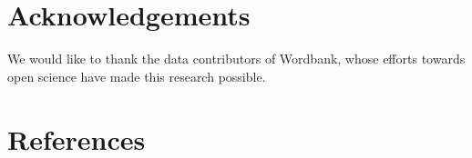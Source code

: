 \documentclass[10pt, letterpaper]{article}
\begin{document}
\pagebreak

\section{Acknowledgements}\label{acknowledgements}

We would like to thank the data contributors of Wordbank, whose efforts
towards open science have made this research possible.

\section{References}\label{references}

\setlength{\parindent}{-0.1in} 
\setlength{\leftskip}{0.125in}

\noindent
\end{document}
